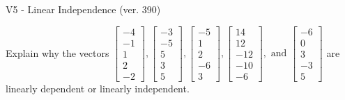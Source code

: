 \begin{exercise}
  \begin{exerciseTitle}V5 - Linear Independence (ver. 390)\end{exerciseTitle}
  \begin{exerciseStatement}
    Explain why the vectors \(\left[\begin{array}{r}
-4 \\
-1 \\
1 \\
2 \\
-2
\end{array}\right] , \left[\begin{array}{r}
-3 \\
-5 \\
5 \\
3 \\
5
\end{array}\right] , \left[\begin{array}{r}
-5 \\
1 \\
2 \\
-6 \\
3
\end{array}\right] , \left[\begin{array}{r}
14 \\
12 \\
-12 \\
-10 \\
-6
\end{array}\right] , \text{ and } \left[\begin{array}{r}
-6 \\
0 \\
3 \\
-3 \\
5
\end{array}\right]\) are linearly dependent or linearly independent.	



\end{exerciseStatement}
\end{exercise}
